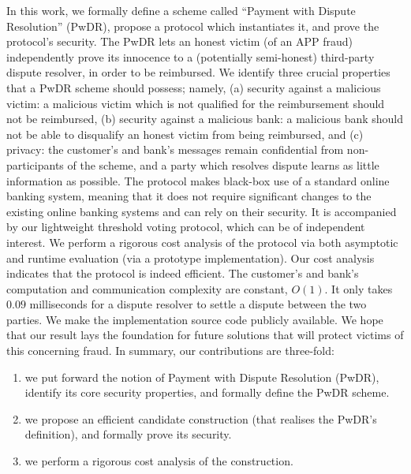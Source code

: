 In this work, we formally define a scheme called ``Payment with Dispute Resolution'' (PwDR),  propose a protocol which instantiates it, and  prove the protocol's security.  The PwDR lets an honest victim (of an APP fraud)  independently prove its innocence to a  (potentially semi-honest) third-party dispute resolver, in order to be reimbursed.  We identify three crucial properties that a PwDR scheme should possess; namely, (a) security against a malicious victim: a malicious victim  which is not qualified for the reimbursement should not be reimbursed, (b) security against a malicious bank: a malicious bank should not be able to disqualify an honest victim  from being reimbursed, and (c) privacy: the customer’s and bank’s messages remain confidential from non-participants of the scheme, and a party which resolves dispute  learns as little information as possible.  The  protocol makes black-box use of a standard  online banking system, meaning that it does not require significant changes to the existing online banking systems and can rely on their security. It is accompanied by our lightweight threshold voting protocol, which can be of independent interest. We perform a rigorous cost analysis of the protocol via both asymptotic and runtime  evaluation (via a prototype implementation). Our cost analysis indicates that the protocol is indeed efficient. The customer's and bank's computation and communication complexity are constant, $O(1)$. It only takes $0.09$ milliseconds for a dispute resolver to settle a dispute between the two parties. We  make  the implementation source code publicly available. We hope that our result lays the foundation for future solutions that will protect victims of this concerning  fraud. In summary,  our contributions are three-fold:
\begin{enumerate}
\item we put forward the notion of Payment with Dispute Resolution (PwDR), identify its core security properties, and  formally define the PwDR scheme.
\item we propose an efficient candidate construction (that realises the PwDR's definition),  and formally prove its security.
\item  we perform a rigorous cost analysis of the construction.     
\end{enumerate}

  



